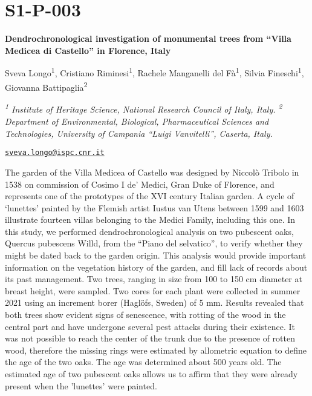 \documentclass[
]{book}
\begin{document}
\hypertarget{s1-p-003}{%
\section*{S1-P-003}\label{s1-p-003}}

\textbf{Dendrochronological investigation of monumental trees from ``Villa Medicea di Castello'' in Florence, Italy}

Sveva Longo\textsuperscript{1}, Cristiano Riminesi\textsuperscript{1}, Rachele Manganelli del Fà\textsuperscript{1}, Silvia Fineschi\textsuperscript{1}, Giovanna Battipaglia\textsuperscript{2}

\emph{\textsuperscript{1} Institute of Heritage Science, National Research Council of Italy, Italy. \textsuperscript{2} Department of Environmental, Biological, Pharmaceutical Sciences and Technologies, University of Campania ``Luigi Vanvitelli'', Caserta, Italy.}

\href{mailto:sveva.longo@ispc.cnr.it}{\nolinkurl{sveva.longo@ispc.cnr.it}}

The garden of the Villa Medicea of Castello was designed by Niccolò Tribolo in 1538 on commission of Cosimo I de' Medici, Gran Duke of Florence, and represents one of the prototypes of the XVI century Italian garden. A cycle of `lunettes' painted by the Flemish artist Iustus van Utens between 1599 and 1603 illustrate fourteen villas belonging to the Medici Family, including this one. In this study, we performed dendrochronological analysis on two pubescent oaks, Quercus pubescens Willd, from the ``Piano del selvatico'', to verify whether they might be dated back to the garden origin. This analysis would provide important information on the vegetation history of the garden, and fill lack of records about its past management. Two trees, ranging in size from 100 to 150 cm diameter at breast height, were sampled. Two cores for each plant were collected in summer 2021 using an increment borer (Haglöfs, Sweden) of 5 mm. Results revealed that both trees show evident signs of senescence, with rotting of the wood in the central part and have undergone several pest attacks during their existence. It was not possible to reach the center of the trunk due to the presence of rotten wood, therefore the missing rings were estimated by allometric equation to define the age of the two oaks. The age was determined about 500 years old. The estimated age of two pubescent oaks allows us to affirm that they were already present when the 'lunettes' were painted.
\end{document}
